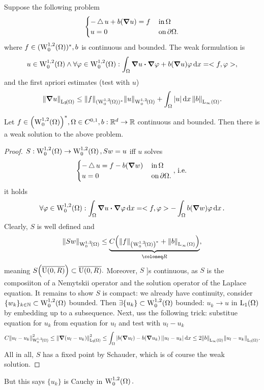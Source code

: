 \documentclass{article}
\begin{document}
\begin{example}
    Suppose the following problem
    \[
	    \begin{cases}
		    - \operatorname{\bigtriangleup} u + b\qty(\grad u) = f & \, \text{in} \, \Omega \\
		    u = 0 & \, \text{on} \, \partial \Omega.
	    \end{cases}
    \]
    where $f \in (\WkpzeroSet[1][2]{\Omega})^{*}, b$ is continuous and bounded. The weak formulation is
    \[
	    u \in \WkpzeroSet[1][2]{\Omega} \wedge \forall \varphi \in \WkpzeroSet[1][2]{\Omega}: \int_{\Omega}\grad u \vdot \grad \varphi + b\qty(\grad u) \varphi\dd{x} = <f,\varphi>,
    \]
    and the first apriori estimates (test with $u$)
    \[
	    \norm{\grad u}_{\LpSet[2]{\Omega}} \leq \norm{f}_{(\WkpzeroSet[1][2]{\Omega})^{*}} \norm{u}_{\WkpzeroSet[1][2]{\Omega}}+ \int_{\Omega}|u|\dd{x} \norm{b}_{\LinfSet{\Omega}}.
    \]
    \begin{theorem}
        Let $f \in \qty(\WkpzeroSet[1][2]{\Omega})^{*}, \Omega \in C^{0,1}, b: \R^d \to \R$ continuous and bounded. Then there is a weak solution to the above problem.
    \end{theorem}
    \begin{proof}
        $S: \WkpzeroSet[1][2]{\Omega} \to \WkpzeroSet[1][2]{\Omega}, Sw = u$ iff $u$ solves
	\[
		\begin{cases}
			- \operatorname{\bigtriangleup} u = f - b\qty(\grad w) & \, \text{in} \, \Omega \\
			u = 0 & \, \text{on} \, \partial \Omega.
		\end{cases}, \, \text{i.e.} \,
	\]
	it holds
	\[
		\forall \varphi \in \WkpzeroSet[1][2]{\Omega}: \int_{\Omega}\grad u \vdot \grad \varphi\dd{x} = <f, \varphi> - \int_{\Omega}b\qty(\grad w) \varphi\dd{x}.
	\]
Clearly, $S$ is well defined and
\[
	\norm{Sw}_{\WkpzeroSet[1][2]{\Omega}} \leq \underbrace{C\qty(\norm{f}_{\qty(\WkpzeroSet[1][2]{\Omega})^{*}}+ \norm{b}_{\LinfSet{\Omega}})}_{\coloneq R},
\]
meaning $S\qty(\overline{\text{U}(0,R)}) \subset \overline{\text{U}(0,R)}.$
Moreover, $S$ ]s continuous, as $S$ is the composiiton of a Nemytskii operator and the solution operator of the Laplace equation. It remains to show $S$ is compact: we already have continuity, consider $\{w_k\}_{k \in \N} \subset \WkpzeroSet[1][2]{\Omega}$ bounded. Then $\exists \{u_k\} \subset \WkpzeroSet[1][2]{\Omega}$ bounded: $u_k \to u$ in $\LpSet[1]{\Omega}$ by embedding up to a subsequence. Next, uss the following trick: substitue equation for $u_k$ from equation for $u_l$ and test with $u_l - u_k$
\[
C \norm{u_l - u_k}_{\WkpzeroSet[1][2]{\Omega}}^{2} \leq	\norm{\grad\qty(u_l - u_k)}_{\LpSet[2]{\Omega}}^{2} \leq \int_{\Omega}|b(\grad u_l) - b\qty(\grad u_k)| |u_l - u_k|\dd{x} \leq 2 \norm{b}_{\LinfSet{\Omega}}\norm{u_l-u_k}_{\LpSet[1]{\Omega}}.
\]
All in all, $S$ has a fixed point by Schauder, which is of course the weak solution.
    \end{proof}
    But this says $\{u_k\}$ is Cauchy in $\WkpzeroSet[1][2]{\Omega}.$
\end{example}
\end{document}
